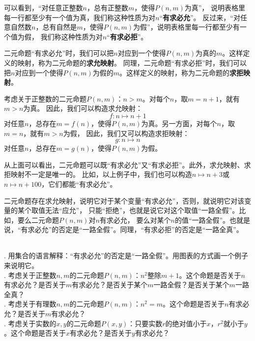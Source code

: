 \documentclass[12pt,UTF8]{ctexbook}
\begin{document}
可以看到，“对任意正整数$n$，总有正整数$m$，使得$P(n,m)$为真”，
说明表格里每一行都至少有一个值为真，我们称这种性质为对$n$“\textbf{有求必允}”。
反过来，“对任意自然数$n$，总有自然是$m$，使得$P(n,m)$为假”，说明表格里每一行都至少有一个值为假，
我们称这种性质为对$n$“\textbf{有求必拒}”。

二元命题“有求必允”时，我们可以把$n$对应到一个使得$P(n,m)$为真的$m$。这样定义的映射，称为二元命题的\textbf{求允映射}。
同理，二元命题“有求必拒”时，我们可以把$n$对应到一个使得$P(n,m)$为假的$m$。这样定义的映射，称为二元命题的\textbf{求拒映射}。

\begin{ex*}
    考虑关于正整数的二元命题$P(n,m)$：$n > m$。对每个$n$，取$m = n + 1$，就有$m > n$为真。
    因此，我们可以构造求允映射：
$$f: n \mapsto n + 1$$
对任意$n$，总存在$m = f(n)$，使得$P(n,m)$为真。另一方面，对每个$n$，取$m = n$，就有$m > n$为假，
因此，我们又可以构造求拒映射：
$$g: n \mapsto n $$
对任意$n$，总存在$m = g(n)$，使得$P(n,m)$为假。
\end{ex*}

从上面可以看出，二元命题可以既“有求必允”又“有求必拒”。此外，求允映射、求拒映射不一定是唯一的。
比如，以上例子中，我们也可以构造$n \mapsto n + 3$或$n \mapsto n + 100$，它们都能“有求必允”。

二元命题存在求允映射，说明它对于某个变量“有求必允”，否则，就说明它对该变量的某个取值无法“应允”，
只能“拒绝”，也就是说它对这个取值“一路全假”。比如，要么二元命题$P(n,m)$对$n$有求必允，
要么对某个$n$的值“一路全假”。也就是说，“有求必允”的否定是“一路全假”。同理，“有求必拒”的否定是“一路全真”。

\begin{xt}
    \mbox{}\\
    . 用集合的语言解释：“有求必允”的否定是“一路全假”。用图表的方式画一个例子来说明它。\\
    . 考虑关于正整数$n, m$的二元命题$P(n,m)$：$n^2$整除$m + 1$。这个命题是否关于$n$有求必允？是否关于$m$有求必允？是否关于某个$m$一路全假？是否关于某个$m$一路全真？\\
    . 考虑关于有理数$n, m$的二元命题$P(n,m)$：$n^2 = m$。这个命题是否关于$n$有求必允？是否关于$m$有求必允？\\
    . 考虑关于实数的$x, y$的二元命题$P(x, y)$：只要实数$r$的绝对值小于$x$，$r^2$就小于$y$。这个命题是否关于$x$有求必允？是否关于$y$有求必允？
\end{xt}
\end{document}
